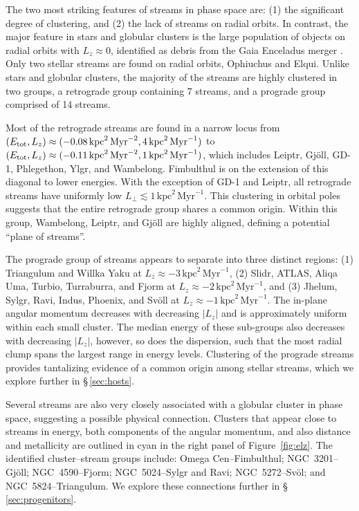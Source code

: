 \documentclass[twocolumn]{aastex63}
\newcommand{\ul}{\ensuremath{\textrm{kpc}^2\,\textrm{Myr}^{-1}}}
\newcommand{\ue}{\ensuremath{\textrm{kpc}^2\,\textrm{Myr}^{-2}}}
\begin{document}
The two most striking features of streams in phase space are: (1) the significant degree of clustering, and (2) the lack of streams on radial orbits.
In contrast, the major feature in stars and globular clusters is the large population of objects on radial orbits with $L_z\approx0$, identified as debris from the Gaia Enceladus merger \citep[e.g.,][]{belokurov2018, helmi2018, naidu2020}.
Only two stellar streams are found on radial orbits, Ophiuchus and Elqui.
Unlike stars and globular clusters, the majority of the streams are highly clustered in two groups, a retrograde group containing 7 streams, and a prograde group comprised of 14 streams.

Most of the retrograde streams are found in a narrow locus from $(E_{\rm tot}, L_z)\approx(-0.08\,\ue,\allowbreak 4\,\ul)$ to $(E_{\rm tot}, L_z)\approx(-0.11\,\ue,\allowbreak 1\,\ul)$, which includes Leiptr, Gj\" oll, GD-1, Phlegethon, Ylgr, and Wambelong.
Fimbulthul is on the extension of this diagonal to lower energies.
With the exception of GD-1 and Leiptr, all retrograde streams have uniformly low $L_\perp\lesssim1\,\ul$.
This clustering in orbital poles suggests that the entire retrograde group shares a common origin.
Within this group, Wambelong, Leiptr, and Gj\" oll are highly aligned, defining a potential ``plane of streams''.

The prograde group of streams appears to separate into three distinct regions: (1) Triangulum and Willka Yaku at $L_z\approx-3\,\ul$, (2) Slidr, ATLAS, Aliqa Uma, Turbio, Turraburra, and Fjorm at $L_z\approx-2\,\ul$, and (3) Jhelum, Sylgr, Ravi, Indus, Phoenix, and Sv\" oll at $L_z\approx-1\,\ul$.
The in-plane angular momentum decreases with decreasing $|L_z|$ and is approximately uniform within each small cluster.
The median energy of these sub-groups also decreases with decreasing $|L_z|$, however, so does the dispersion, such that the most radial clump spans the largest range in energy levels.
Clustering of the prograde streams  provides tantalizing evidence of a common origin among stellar streams, which we explore further in \S\,\ref{sec:hosts}.

Several streams are also very closely associated with a globular cluster in phase space, suggesting a possible physical connection.
Clusters that appear close to streams in energy, both components of the angular momentum, and also distance and metallicity are outlined in cyan in the right panel of Figure~\ref{fig:elz}.
The identified cluster--stream groups include: Omega Cen--Fimbulthul; NGC~3201--Gj\" oll; NGC~4590--Fjorm; NGC~5024--Sylgr and Ravi; NGC~5272--Sv\" ol; and NGC~5824--Triangulum.
We explore these connections further in \S\,\ref{sec:progenitors}.
\end{document}
